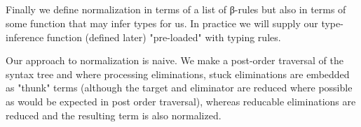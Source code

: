 \begin{code}
\AgdaSpace{}%
\AgdaSpace{}%
\AgdaSpace{}%
\<%
\\
\>[0]\AgdaSpace{}%
\AgdaSymbol{|}\AgdaSpace{}%
\AgdaSpace{}%
%
\>[16]\AgdaSymbol{=}\AgdaSpace{}%
\AgdaSpace{}%
\AgdaSymbol{(}\AgdaSpace{}%
\AgdaOperator{\AgdaInductiveConstructor{,}}\AgdaSpace{}%
\AgdaSymbol{)}\<%
\\
%
\\[\AgdaEmptyExtraSkip]%
\>[0]\AgdaSpace{}%
\AgdaSymbol{:}%
\>[214I]\AgdaSpace{}%
%
\>[34]\<%
\\
\>[.][@{}l@{}]\<[214I]%
\>[9]\AgdaSymbol{(}\AgdaSpace{}%
\AgdaSpace{}%
\AgdaSpace{}%
\AgdaSymbol{:}\AgdaSpace{}%
\AgdaSpace{}%
\AgdaSpace{}%
\AgdaSymbol{)}%
\>[41]\<%
\\
%
\>[9]\AgdaSpace{}%
\AgdaSymbol{(}\AgdaSpace{}%
\AgdaSpace{}%
\AgdaSymbol{)}\<%
\\
\>[0]\AgdaSpace{}%
\AgdaSpace{}%
\AgdaSpace{}%
\AgdaSpace{}%
\<%
\\
\>[0][@{}l@{\AgdaIndent{0}}]%
\>[2]\AgdaSymbol{=}%
\>[229I]\<%
\\
\>[229I][@{}l@{\AgdaIndent{0}}]%
\>[6]\AgdaSymbol{(}\AgdaSpace{}%
\AgdaOperator{\AgdaInductiveConstructor{,}}\AgdaSpace{}%
\AgdaSymbol{)}\AgdaSpace{}%
\AgdaSpace{}%
\AgdaSpace{}%
\AgdaSpace{}%
\AgdaSpace{}%
\AgdaSpace{}%
\<%
\\
%
\>[6]\AgdaSpace{}%
\AgdaSymbol{(}\AgdaSpace{}%
\AgdaSpace{}%
\AgdaSymbol{)}\<%
\end{code}

Finally we define normalization in terms of a list of β-rules but also
in terms of some function that may infer types for us. In practice we will
supply our type-inference function (defined later) "pre-loaded" with typing
rules.

Our approach to normalization is naive. We make a post-order traversal of
the syntax tree and where processing eliminations, stuck eliminations are
embedded as "thunk" terms (although the target and eliminator are reduced
where possible as would be expected in post order traversal), whereas
reducable eliminations are reduced and the resulting term is also normalized.

